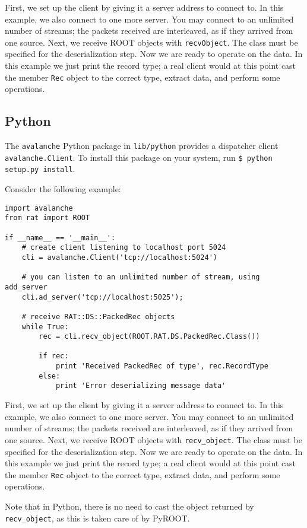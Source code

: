 \documentclass{article}
\begin{document}
First, we set up the client by giving it a server address to connect to. In this example, we also connect to one more server. You may connect to an unlimited number of streams; the packets received are interleaved, as if they arrived from one source. Next, we receive ROOT objects with {\tt recvObject}. The class must be specified for the deserialization step. Now we are ready to operate on the data. In this example we just print the record type; a real client would at this point cast the member {\tt Rec} object to the correct type, extract data, and perform some operations.

\subsection{Python}
The {\tt avalanche} Python package in {\tt lib/python} provides a dispatcher client {\tt avalanche.Client}. To install this package on your system, run {\tt \$ python setup.py install}.

Consider the following example:

\begin{verbatim}
import avalanche
from rat import ROOT

if __name__ == '__main__':
    # create client listening to localhost port 5024
    cli = avalanche.Client('tcp://localhost:5024')

    # you can listen to an unlimited number of stream, using add_server
    cli.ad_server('tcp://localhost:5025');

    # receive RAT::DS::PackedRec objects
    while True:
        rec = cli.recv_object(ROOT.RAT.DS.PackedRec.Class())

        if rec:
            print 'Received PackedRec of type', rec.RecordType
        else:
            print 'Error deserializing message data'
\end{verbatim}
First, we set up the client by giving it a server address to connect to. In this example, we also connect to one more server. You may connect to an unlimited number of streams; the packets received are interleaved, as if they arrived from one source. Next, we receive ROOT objects with {\tt recv\_object}. The class must be specified for the deserialization step. Now we are ready to operate on the data. In this example we just print the record type; a real client would at this point cast the member {\tt Rec} object to the correct type, extract data, and perform some operations.

Note that in Python, there is no need to cast the object returned by {\tt recv\_object}, as this is taken care of by PyROOT.
\end{document}
